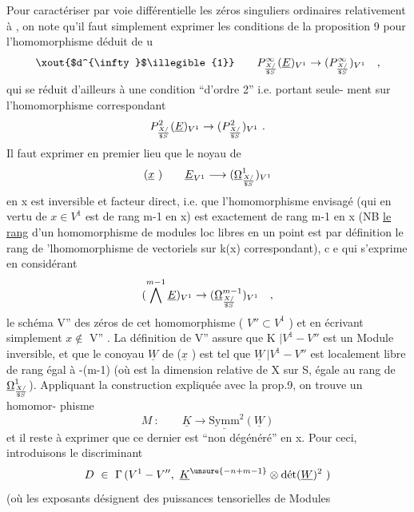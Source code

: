 
Pour caractériser par voie différentielle  les  zéros singuliers ordinaires
relativement à ,  on note qu'il faut simplement exprimer  les conditions
de la proposition 9  pour  l'homomorphisme  déduit de u
\[ \xout{$d^{\infty}$\illegible{1}} \qquad P^{\infty}_{X/\over{\$}{S}}(\underline{E})_{V^1}\to(P^{\infty}_{X/\over{\$}{S}})_{V^1} \quad , \]
qui se réduit d'ailleurs à une condition  ``d'ordre 2'' i.e. portant seule-%
ment sur l'homomorphisme correspondant
\[ P^{2}_{X/\over{\$}{S}}(\underline{E})_{V^1}\to(P^{2}_{X/\over{\$}{S}})_{V^1} \ . \]
Il faut exprimer en premier lieu  que  le noyau  de
\[ (\underline{x}\ ) \qquad \underline{E}_{V^1} \longrightarrow (\underline{\Omega}^{1}_{X/\over{\$}{S}})_{V^1} \]
en x est inversible et facteur direct, i.e. que l'homomorphisme envisagé
(qui en vertu de  $x\in V^1$ est  de rang  m-1 en x) est exactement de rang
\margin{(} m-1 en x  (NB \uline{le rang} d'un  homomorphisme de modules loc libres en un
point est par définition le rang de 'lhomomorphisme de vectoriels sur k(x)
correspondant), c e qui s'exprime en considérant
\[ (\bigwedge^{m-1} \underline{E})_{V^1}\to(\underline{\Omega}^{m-1}_{X/\over{\$}{S}})_{V^1} \quad , \]
le  schéma  V'' des zéros de cet homomorphisme  ( $V''\subset V^1$ )  et en écrivant
simplement $x\notin$ V'' .  La définition de V'' assure que  K $|V^1-V''$  est un
Module inversible,  et que  le conoyau  $\underline{W}$  de ($\underline{x}$ )  est tel que
$\underline{W}\,|V^1-V''$  est  localement libre de rang égal à  -(m-1)  (où  est la
dimension relative de X sur S, égale au rang de $\underline{\Omega}^{1}_{X/\over{\$}{S}}$).  Appliquant la
construction expliquée avec la prop.9\hand{$^{*}$}, on trouve  un homomor-%
phisme
\[ M\ : \qquad \underline{K} \longrightarrow \underline{\mathrm{Symm}}^{2}(\underline{W}) \]
et il reste à exprimer que ce dernier est ``non dégénéré'' en x. Pour ceci,
introduisons le  discriminant
\[ D\ \in\ \Gamma\,(V^1-V'',\ \underline{K}^{\unsure{-n+m-1}}\otimes \text{dét}(\underline{W})^{2}\ ) \]
(où les exposants désignent des puissances tensorielles de Modules

